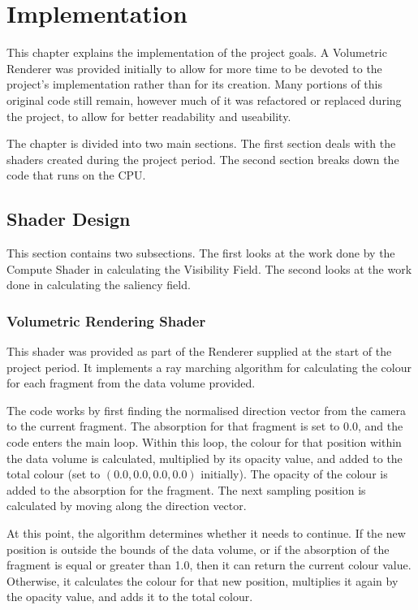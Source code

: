 \chapter{Implementation}

This chapter explains the implementation of the project goals. A Volumetric Renderer was provided initially to allow for more time to be devoted to the project's implementation rather than for its creation. Many portions of this original code still remain, however much of it was refactored or replaced during the project, to allow for better readability and useability.

The chapter is divided into two main sections. The first section deals with the shaders created during the project period. The second section breaks down the code that runs on the CPU. 

\section{Shader Design}

This section contains two subsections. The first looks at the work done by the Compute Shader in calculating the Visibility Field. The second looks at the work done in calculating the saliency field.

\subsection{Volumetric Rendering Shader}

This shader was provided as part of the Renderer supplied at the start of the project period. It implements a ray marching algorithm for calculating the colour for each fragment from the data volume provided.

The code works by first finding the normalised direction vector from the camera to the current fragment. The absorption for that fragment is set to $0.0$, and the code enters the main loop. Within this loop, the colour for that position within the data volume is calculated, multiplied by its opacity value, and added to the total colour (set to $(0.0, 0.0, 0.0, 0.0)$ initially). The opacity of the colour is added to the absorption for the fragment. The next sampling position is calculated by moving along the direction vector. 

At this point, the algorithm determines whether it needs to continue. If the new position is outside the bounds of the data volume, or if the absorption of the fragment is equal or greater than 1.0, then it can return the current colour value. Otherwise, it calculates the colour for that new position, multiplies it again by the opacity value, and adds it to the total colour.

